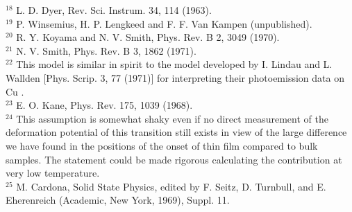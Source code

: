 \documentclass[10pt]{article}
\begin{document}
${ }^{18}$ L. D. Dyer, Rev. Sci. Instrum. 34, 114 (1963).\\
${ }^{19}$ P. Winsemius, H. P. Lengkeed and F. F. Van Kampen (unpublished).\\
${ }^{20}$ R. Y. Koyama and N. V. Smith, Phys. Rev. B 2, 3049 (1970).\\
${ }^{21}$ N. V. Smith, Phys. Rev. B 3, 1862 (1971).\\
${ }^{22}$ This model is similar in spirit to the model developed by I. Lindau and L. Wallden [Phys. Scrip. 3, 77 (1971)] for interpreting their photoemission data on Cu .\\
${ }^{23}$ E. O. Kane, Phys. Rev. 175, 1039 (1968).\\
${ }^{24}$ This assumption is somewhat shaky even if no direct measurement of the deformation potential of this transition still exists in view of the large difference we have found in the positions of the onset of thin film compared to bulk samples. The statement could be made rigorous calculating the contribution at very low temperature.\\
${ }^{25}$ M. Cardona, Solid State Physics, edited by F. Seitz, D. Turnbull, and E. Eherenreich (Academic, New York, 1969), Suppl. 11.
\end{document}
